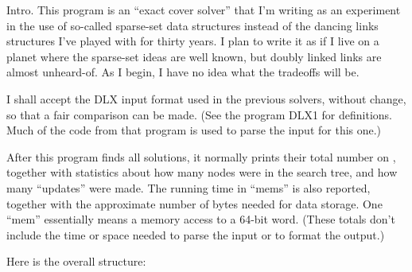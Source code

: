 
\let\Xmod=\bmod %

\datethis

Intro. This program is an ``exact cover solver'' that I'm writing
as an experiment in the use of so-called sparse-set data structures
instead of the dancing links structures I've played with for thirty years.
I plan to write it as if I live on a planet where the sparse-set
ideas are well known, but doubly linked links are almost unheard-of.
As I begin, I have no idea what the tradeoffs will be.

I shall accept the {\mc DLX} input format used in the previous solvers,
without change, so that a fair comparison can be made.
(See the program {\mc DLX1} for definitions. Much of the code from
that program is used to parse the input for this one.)

\fi

After this program finds all solutions, it normally prints their total
number on , together with statistics about how many
nodes were in the search tree, and how many ``updates'' were made.
The running time in ``mems'' is also reported, together with the approximate
number of bytes needed for data storage. One ``mem'' essentially means a
memory access to a 64-bit word.
(These totals don't include the time or space needed to parse the
input or to format the output.)

Here is the overall structure:

